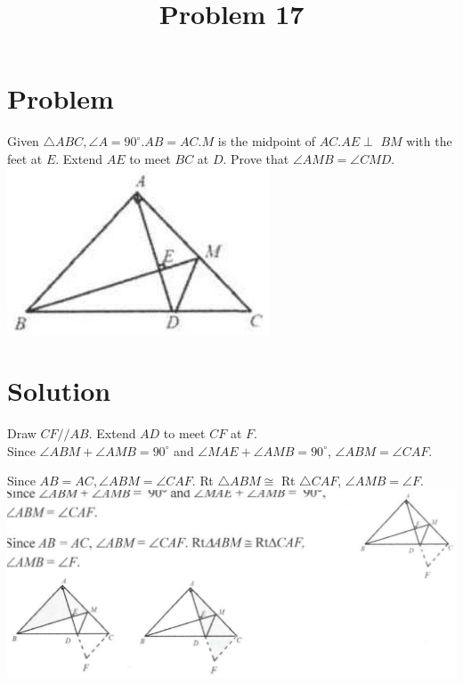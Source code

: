 \documentclass{article}
\title{Problem 17}
\date{}
\begin{document}
\maketitle

\section*{Problem}
Given \(\triangle A B C, \angle A=90^{\circ} . A B=A C . M\) is the midpoint of \(A C . A E \perp\) \(B M\) with the feet at \(E\). Extend \(A E\) to meet \(B C\) at \(D\). Prove that \(\angle A M B=\angle C M D\).\\
\centering
\includegraphics[width=\textwidth]{images/129(3).jpg}

\section*{Solution}
Draw \(C F / / A B\). Extend \(A D\) to meet \(C F\) at \(F\).\\
Since \(\angle A B M+\angle A M B=90^{\circ}\) and \(\angle M A E+\angle A M B=90^{\circ}\), \(\angle A B M=\angle C A F\).

Since \(A B=A C, \angle A B M=\angle C A F\). Rt \(\triangle A B M \cong\) Rt \(\triangle C A F\), \(\angle A M B=\angle F\).\\
\centering
\includegraphics[width=\textwidth]{images/139(1).jpg}
\end{document}
